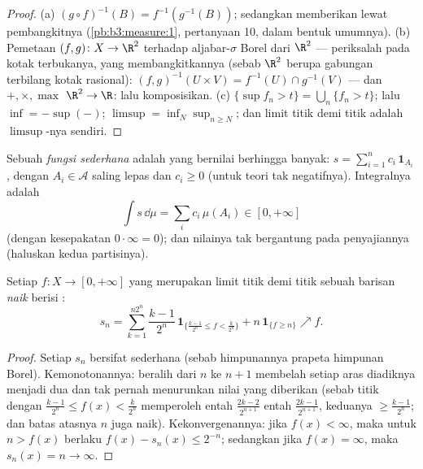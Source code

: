 \begin{proof}
(a) $(g\circ f)^{-1}(B) = f^{-1}(g^{-1}(B))$; sedangkan  memberikan
 lewat  pembangkitnya
(\cref{pb:b3:measure:1}, pertanyaan 10, dalam bentuk umumnya).
(b) Pemetaan $(f, g) \colon X \to \R^2$  terhadap aljabar-$\sigma$
Borel dari $\R^2$ --- periksalah pada kotak terbukanya, yang
membangkitkannya (sebab  $\R^2$ berupa gabungan terbilang kotak
rasional): $(f,g)^{-1}(U\times V) = f^{-1}(U)\cap g^{-1}(V)$ ---
dan $+, \times, \max$  $\R^2 \to \R$: lalu komposisikan.
(c) $\{\sup f_n > t\} = \bigcup_n\{f_n > t\}$; lalu $\inf = -\sup(-)$;
$\limsup = \inf_N\sup_{n \geq N}$; dan limit titik demi titik adalah
$\limsup$-nya sendiri.
\end{proof}

\begin{definition}\label{def:b3:lebesgue:simple}
Sebuah \emph{fungsi sederhana} adalah  yang bernilai berhingga banyak: $s = \sum_{i=1}^n
c_i\,\mathbf 1_{A_i}$, dengan $A_i \in \mathcal A$ saling lepas dan $c_i \geq
0$ (untuk teori tak negatifnya). Integralnya adalah
\[
\int s\,\dd\mu = \sum_i c_i\,\mu(A_i) \in [0, +\infty]
\]
(dengan kesepakatan $0\cdot\infty = 0$); dan nilainya tak bergantung pada
penyajiannya (haluskan kedua partisinya).
\end{definition}

\begin{theorem}
\label{thm:b3:lebesgue:approximation}
Setiap $f \colon X \to [0, +\infty]$ yang  merupakan limit titik
demi titik sebuah barisan \emph{naik} berisi :
\[
s_n = \sum_{k=1}^{n2^n} \frac{k-1}{2^n}\,
\mathbf 1_{\{\frac{k-1}{2^n} \leq f < \frac k{2^n}\}}
+ n\,\mathbf 1_{\{f \geq n\}} \nearrow f .
\]
\end{theorem}

\begin{proof}
Setiap $s_n$ bersifat sederhana (sebab himpunannya prapeta himpunan Borel).
Kemonotonannya: beralih dari $n$ ke $n+1$ membelah setiap
aras diadiknya menjadi dua dan tak pernah menurunkan nilai yang diberikan (sebab titik
dengan $\frac{k-1}{2^n} \leq f(x) < \frac k{2^n}$ memperoleh entah
$\frac{2k-2}{2^{n+1}}$ entah $\frac{2k-1}{2^{n+1}}$, keduanya $\geq
\frac{k-1}{2^n}$; dan batas atasnya $n$ juga naik). Kekonvergenannya: jika
$f(x) < \infty$, maka untuk $n > f(x)$ berlaku $f(x) - s_n(x) \leq
2^{-n}$; sedangkan jika $f(x) = \infty$, maka $s_n(x) = n \to \infty$.
\end{proof}

